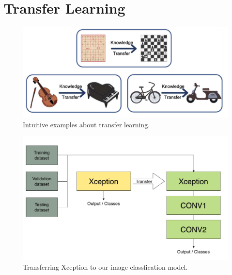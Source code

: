 \section{Transfer Learning}

\begin{figure}[h]
  \centering
  \includegraphics[width=\linewidth]{figs/transfer_learning.png}
  \caption{Intuitive examples about transfer learning.}
  \label{fig:transfer}
\end{figure}

\begin{figure}[h]
  \centering
  \includegraphics[width=\linewidth]{figs/xception.png}
  \caption{Transferring Xception to our image classfication model.}
  \label{fig:transfer}
\end{figure}
